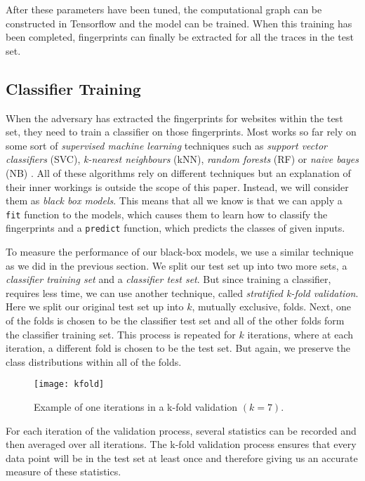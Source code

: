 After these parameters have been tuned, the computational graph can be constructed in Tensorflow and the model can be trained.
When this training has been completed, fingerprints can finally be extracted for all the traces in the test set.

\subsection{Classifier Training} \label{sec:classifier-training}

When the adversary has extracted the fingerprints for websites within the test set, they need to train a classifier on those fingerprints.
Most works so far rely on some sort of \textit{supervised machine learning} techniques such as \textit{support vector classifiers} (SVC), \textit{k-nearest neighbours} (kNN), \textit{random forests} (RF) or \textit{naive bayes} (NB) \cite{panchenko1,panchenko2,wang_cai_johnson_nithyanand_goldberg_2014,kfingerprinting,naivebayes}.
All of these algorithms rely on different techniques but an explanation of their inner workings is outside the scope of this paper.
Instead, we will consider them as \textit{black box models}.
This means that all we know is that we can apply a \texttt{fit} function to the models, which causes them to learn how to classify the fingerprints and a \texttt{predict} function, which predicts the classes of given inputs.

To measure the performance of our black-box models, we use a similar technique as we did in the previous section.
We split our test set up into two more sets, a \textit{classifier training set} and a \textit{classifier test set}.
But since training a classifier, requires less time, we can use another technique, called \textit{stratified k-fold validation}.
Here we split our original test set up into $k$, mutually exclusive, folds.
Next, one of the folds is chosen to be the classifier test set and all of the other folds form the classifier training set.
This process is repeated for $k$ iterations, where at each iteration, a different fold is chosen to be the test set.
But again, we preserve the class distributions within all of the folds.

\begin{figure}[ht]
  \centering
  \texttt{[image: kfold]}
  \caption{Example of one iterations in a k-fold validation $(k = 7)$.}
  \label{fig:kfold}
\end{figure}

For each iteration of the validation process, several statistics can be recorded and then averaged over all iterations.
The k-fold validation process ensures that every data point will be in the test set at least once and therefore giving us an accurate measure of these statistics.

